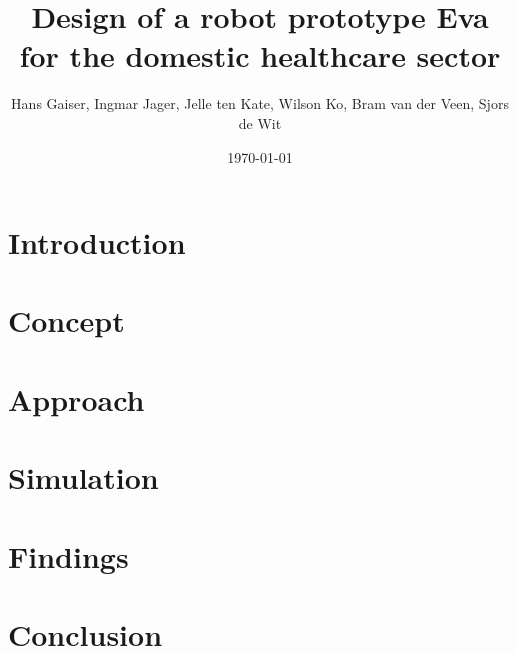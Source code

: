 \documentclass[a4paper,10pt,twocolumn]{article}
\begin{document}


\newcommand{\todo}[1]{\textbf{\textsc{\textcolor{red}{[#1]}}}}
\title{Design of a robot prototype Eva for the domestic healthcare sector}
\author{Hans Gaiser, Ingmar Jager, Jelle ten Kate, Wilson Ko, Bram van der Veen, Sjors de Wit}
\date{\today}


\maketitle



\section*{Introduction}
\label{problem}


\section*{Concept}
\label{concept}


\section*{Approach}
\label{approach}


\section*{Simulation}
\label{simulation}


\section*{Findings}
\label{findings}


\section*{Conclusion}
\label{conclusion}


\newpage

\printbibliography
\end{document}
